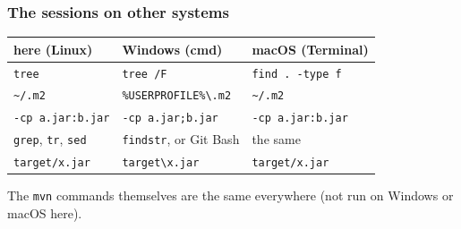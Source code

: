 \documentclass[aspectratio=169,10pt,compress]{beamer}
\begin{document}




\begin{frame}[t,fragile] \frametitle{The sessions on other systems}
  \begin{center}\small
  \begin{tabular}{@{}L{0.3\textwidth}L{0.3\textwidth}L{0.32\textwidth}@{}}
    \toprule
    \textbf{here (Linux)}              & \textbf{Windows (cmd)}                      & \textbf{macOS (Terminal)} \\
    \midrule
    \texttt{tree}                      & \texttt{tree /F}                            & \texttt{find . -type f} \\
    \texttt{\textasciitilde/.m2}       & \texttt{\%USERPROFILE\%\textbackslash .m2} & \texttt{\textasciitilde/.m2} \\
    \texttt{-cp a.jar:b.jar}           & \texttt{-cp a.jar;b.jar}                    & \texttt{-cp a.jar:b.jar} \\
    \texttt{grep}, \texttt{tr}, \texttt{sed} & \texttt{findstr}, or Git Bash          & the same \\
    \texttt{target/x.jar}              & \texttt{target\textbackslash x.jar}         & \texttt{target/x.jar} \\
    \bottomrule
  \end{tabular}
  \end{center}
  \small The \texttt{mvn} commands themselves are the same everywhere (not run on Windows or macOS here).
\end{frame}

\end{document}

